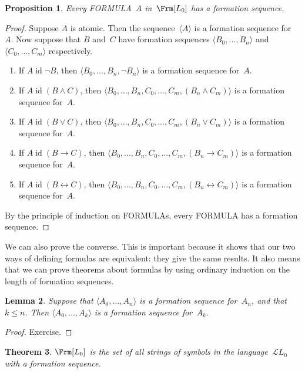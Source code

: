 \documentclass[10pt,a4paper]{article}
\newcommand*{\olup}[1]{\MakeUppercase{#1}}
\theoremstyle{plain}
\newtheorem{thm}{Theorem}[section]
\newtheorem{lem}[thm]{Lemma}
\newtheorem{prop}[thm]{Proposition}
\theoremstyle{definition}
\theoremstyle{remark}
\newcommand*{\ollabel}[1]{\label{#1}}
\providecommand{\lif}{\mathbin{\rightarrow}}
\providecommand{\Lang}{\ensuremath{\mathcal{L}}}
\providecommand{\tuple}[1]{\langle #1 \rangle}
\providecommand{\tagitem}[1]{\item[#1]}
\providecommand{\liff}{\mathbin{\leftrightarrow}}
\providecommand{\ident}{\operatorname{id}}
\begin{document}
\begin{prop}
\ollabel{prop:formed}
Every \olup{formula}~$A$ in~$\Frm[L_0]$ has a formation sequence.
\end{prop}

\begin{proof}
Suppose $A$ is atomic. Then the sequence~$\tuple{A}$ is a
formation sequence for~$A$.
%
Now suppose that $B$ and~$C$ have formation sequences
$\tuple{B_0,\dotsc,B_n}$ and $\tuple{C_0,\dotsc,C_m}$
respectively.
%
\begin{enumerate}
  \tagitem{prvNot}{If $A \ident \lnot B$,
      then $\tuple{B_0,\dotsc,B_n,\lnot B_n}$
      is a formation sequence for~$A$.}{}
  \tagitem{prvAnd}{If $A \ident (B \land C)$,
      then $\tuple{B_0,\dotsc,B_n,C_0,\dotsc,C_m,(B_n \land C_m)}$
      is a formation sequence for~$A$.}{}
  \tagitem{prvOr}{If $A \ident (B \lor C)$,
      then $\tuple{B_0,\dotsc,B_n,C_0,\dotsc,C_m,(B_n \lor C_m)}$
      is a formation sequence for~$A$.}{}
  \tagitem{prvIf}{If $A \ident (B \lif C)$,
      then $\tuple{B_0,\dotsc,B_n,C_0,\dotsc,C_m,(B_n \lif C_m)}$
      is a formation sequence for~$A$.}{}
  \tagitem{prvIff}{If $A \ident (B \liff C)$,
      then $\tuple{B_0,\dotsc,B_n,C_0,\dotsc,C_m,(B_n \liff C_m)}$
      is a formation sequence for~$A$.}{}
\end{enumerate}
By the principle of induction on \olup{formula}s,
every \olup{formula} has a formation sequence.
\end{proof}

We can also prove the converse. This is important because it shows
that our two ways of defining formulas are equivalent: they give
the same results. It also means that we can prove theorems about
formulas by using ordinary induction on the length of formation
sequences.

\begin{lem}
\ollabel{lem:fseq-init}
Suppose that $\tuple{A_0,\dotsc,A_n}$ is a formation sequence
for~$A_n$, and that $k \leq n$. Then $\tuple{A_0,\dotsc,A_k}$
is a formation sequence for~$A_k$.
\end{lem}

\begin{proof}
Exercise.
\end{proof}

\begin{thm}
\ollabel{thm:fseq-frm-equiv}
$\Frm[L_0]$ is the set of all strings of symbols
in the language~$\Lang L_0$ with a formation sequence.
\end{thm}
\end{document}
